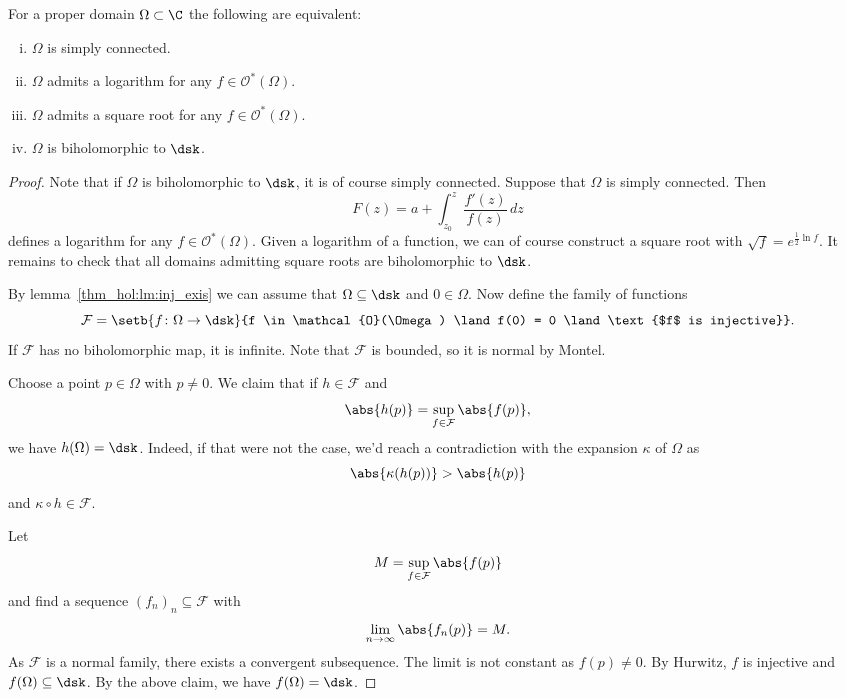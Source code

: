 \begin{izrek}
For a proper domain $\Omega \subset \C$ the following are
equivalent:

\begin{enumerate}[i)]
\item $\Omega$ is simply connected.
\item $\Omega$ admits a logarithm for any
$f \in \mathcal{O}^*(\Omega)$.
\item $\Omega$ admits a square root for any
$f \in \mathcal{O}^*(\Omega)$.
\item $\Omega$ is biholomorphic to $\dsk$.
\end{enumerate}
\end{izrek}

\begin{proof}
Note that if $\Omega$ is biholomorphic to $\dsk$, it is of course
simply connected. Suppose that $\Omega$ is simply connected. Then
\[
F(z) = a + \int_{z_0}^z \frac{f'(z)}{f(z)}\,dz
\]
defines a logarithm for any $f \in \mathcal{O}^*(\Omega)$. Given a
logarithm of a function, we can of course construct a square root
with $\sqrt{f} = e^{\frac{1}{2} \ln f}$. It remains to check that
all domains admitting square roots are biholomorphic to $\dsk$.

By lemma~\ref{thm_hol:lm:inj_exis} we can assume that
$\Omega \subseteq \dsk$ and $0 \in \Omega$. Now define the family
of functions
\[
\mathcal{F} = \setb{f \colon \Omega \to \dsk}
{f \in \mathcal{O}(\Omega) \land
f(0) = 0 \land \text{$f$ is injective}}.
\]
If $\mathcal{F}$ has no biholomorphic map, it is infinite. Note
that $\mathcal{F}$ is bounded, so it is normal by Montel.

Choose a point $p \in \Omega$ with $p \ne 0$. We claim that if
$h \in \mathcal{F}$ and
\[
\abs{h(p)} = \sup_{f \in \mathcal{F}} \abs{f(p)},
\]
we have $h(\Omega) = \dsk$. Indeed, if that were not the case, we'd
reach a contradiction with the expansion $\kappa$ of $\Omega$ as
\[
\abs{\kappa(h(p))} > \abs{h(p)}
\]
and $\kappa \circ h \in \mathcal{F}$.

Let
\[
M = \sup_{f \in \mathcal{F}} \abs{f(p)}
\]
and find a sequence $(f_n)_n \subseteq \mathcal{F}$ with
\[
\lim_{n \to \infty} \abs{f_n(p)} = M.
\]
As $\mathcal{F}$ is a normal family, there exists a convergent
subsequence. The limit is not constant as $f(p) \ne 0$. By Hurwitz,
$f$ is injective and $f(\Omega) \subseteq \dsk$. By the above
claim, we have $f(\Omega) = \dsk$.
\end{proof}

